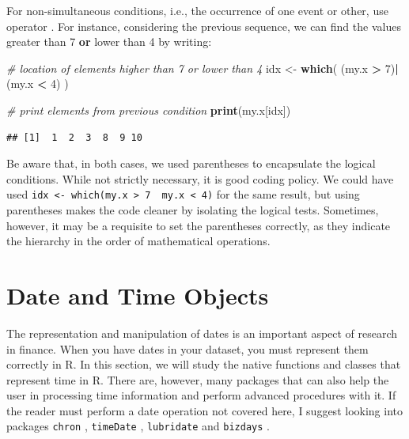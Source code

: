 \documentclass[11pt,]{book}
\newenvironment{Shaded}{\begin{snugshade}}{\end{snugshade}}
\newcommand{\KeywordTok}[1]{\textcolor[rgb]{0.27,0.27,0.27}{\textbf{#1}}}
\newcommand{\DecValTok}[1]{\textcolor[rgb]{0.06,0.06,0.06}{#1}}
\newcommand{\StringTok}[1]{\textcolor[rgb]{0.5,0.5,0.5}{#1}}
\newcommand{\CommentTok}[1]{\textcolor[rgb]{0.56,0.35,0.01}{\textit{#1}}}
\newcommand{\OperatorTok}[1]{\textcolor[rgb]{0.81,0.36,0.00}{\textbf{#1}}}
\newcommand{\NormalTok}[1]{#1}
\begin{document}
For non-simultaneous conditions, i.e., the occurrence of one event or
other, use operator \texttt{\textbar{}}. For instance, considering the
previous sequence, we can find the values greater than 7 \textbf{or}
lower than 4 by writing: 

\begin{Shaded}
\begin{Highlighting}[]
\CommentTok{# location of elements higher than 7 or lower than 4}
\NormalTok{idx <-}\StringTok{ }\KeywordTok{which}\NormalTok{( (my.x }\OperatorTok{>}\StringTok{ }\DecValTok{7}\NormalTok{)}\OperatorTok{|}\NormalTok{(my.x }\OperatorTok{<}\StringTok{ }\DecValTok{4}\NormalTok{) )}

\CommentTok{# print elements from previous condition}
\KeywordTok{print}\NormalTok{(my.x[idx])}
\end{Highlighting}
\end{Shaded}

\begin{verbatim}
## [1]  1  2  3  8  9 10
\end{verbatim}

Be aware that, in both cases, we used parentheses to encapsulate the
logical conditions. While not strictly necessary, it is good coding
policy. We could have used
\texttt{idx\ \textless{}-\ which(my.x\ \textgreater{}\ 7\ \textbar{}\ my.x\ \textless{}\ 4)}
for the same result, but using parentheses makes the code cleaner by
isolating the logical tests. Sometimes, however, it may be a requisite
to set the parentheses correctly, as they indicate the hierarchy in the
order of mathematical operations.

\section{Date and Time Objects}\label{date-and-time-objects}

The representation and manipulation of dates is an important aspect of
research in finance. When you have dates in your dataset, you must
represent them correctly in R. In this section, we will study the native
functions and classes that represent time in R. There are, however, many
packages that can also help the user in processing time information and
perform advanced procedures with it. If the reader must perform a date
operation not covered here, I suggest looking into packages
\texttt{chron} \citep{chron}, \texttt{timeDate} \citep{timeDate},
\texttt{lubridate} \citep{lubridate}and \texttt{bizdays}
\citep{bizdays}.   
\end{document}
